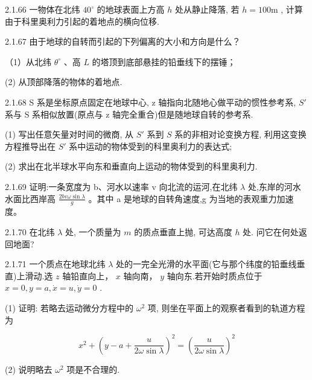 \begin{problem}{2.1.66}
一物体在北纬 $40^{\circ}$ 的地球表面上方高 $h$ 处从静止降落, 若 $h = 100\mathrm{m}$ , 计算由于科里奥利力引起的着地点的横向位移.
\end{problem}
\clearpage


\begin{problem}{2.1.67}
由于地球的自转而引起的下列偏离的大小和方向是什么？

（1）从北纬 $\theta^{\circ}$ 、高 $L$ 的塔顶到底部悬挂的铅垂线下的摆锤；

(2) 从顶部降落的物体的着地点.
\end{problem}
\clearpage


\begin{problem}{2.1.68}
S 系是坐标原点固定在地球中心, z 轴指向北随地心做平动的惯性参考系, $S'$ 系与 S 系相似放置(原点与 z 轴完全重合)但是随地球自转的参考系.

(1) 写出任意矢量对时间的微商, 从 $S'$ 系到 $S$ 系的非相对论变换方程, 利用这变换方程推导出在 $S'$ 系中运动的物体受到的科里奥利力的表达式;

(2) 求出在北半球水平向东和垂直向上运动的物体受到的科里奥利力.
\end{problem}
\clearpage


\begin{problem}{2.1.69}
证明:一条宽度为 b、河水以速率 v 向北流的运河,在北纬 $\lambda$ 处,东岸的河水水面比西岸高 $\frac{2bv\omega\sin\lambda}{g}$ 。其中 a 是地球的自转角速度,g 为当地的表观重力加速度。
\end{problem}
\clearpage


\begin{problem}{2.1.70}
在北纬 $\lambda$ 处, 一个质量为 $m$ 的质点垂直上抛, 可达高度 $h$ 处. 问它在何处返回地面?
\end{problem}
\clearpage


\begin{problem}{2.1.71}
一个质点在地球北纬 $\lambda$ 处的一完全光滑的水平面(它与那个纬度的铅垂线垂直)上滑动.选 $z$ 轴铅直向上， $x$ 轴向南， $y$ 轴向东.若开始时质点位于 $x = 0, y = a, \dot{x} = u, \dot{y} = 0$ .

(1) 证明: 若略去运动微分方程中的 $\omega^2$ 项, 则坐在平面上的观察者看到的轨道方程为

\[
x ^ {2} + \left(y - a + \frac {u}{2 \omega \sin \lambda}\right) ^ {2} = \left(\frac {u}{2 \omega \sin \lambda}\right) ^ {2}
\]

(2) 说明略去 $\omega^{2}$ 项是不合理的.
\end{problem}
\clearpage


